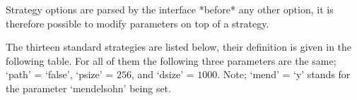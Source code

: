     Strategy  options  are parsed  by  the  interface  *before* any  other
    option,  it is therefore  possible to  modify parameters  on top  of a
    strategy.

    The thirteen standard strategies are listed below, their definition is
    given  in the following  table. For  all of  them the  following three
    parameters  are the  same;  `path'  = `false',  `psize'  = $256$,  and
    `dsize' = $1000$. Note;  `mend' = `y' stands for the parameter 
    `mendelsohn'  being set.


